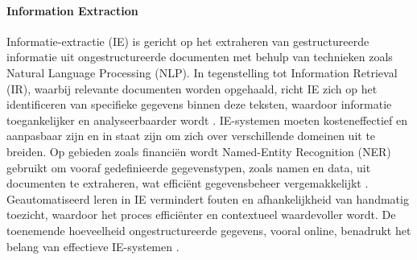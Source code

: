 \paragraph{Information Extraction}
Informatie-extractie (IE) is gericht op het extraheren van gestructureerde informatie uit ongestructureerde documenten met behulp van technieken zoals Natural Language Processing (NLP). In tegenstelling tot Information Retrieval (IR), waarbij relevante documenten worden opgehaald, richt IE zich op het identificeren van specifieke gegevens binnen deze teksten, waardoor informatie toegankelijker en analyseerbaarder wordt \autocite{Javija2024}. IE-systemen moeten kosteneffectief en aanpasbaar zijn en in staat zijn om zich over verschillende domeinen uit te breiden. Op gebieden zoals financiën wordt Named-Entity Recognition (NER) gebruikt om vooraf gedefinieerde gegevenstypen, zoals namen en data, uit documenten te extraheren, wat efficiënt gegevensbeheer vergemakkelijkt \autocite{Gupta2020}. Geautomatiseerd leren in IE vermindert fouten en afhankelijkheid van handmatig toezicht, waardoor het proces efficiënter en contextueel waardevoller wordt. De toenemende hoeveelheid ongestructureerde gegevens, vooral online, benadrukt het belang van effectieve IE-systemen \autocite{Javija2024}.


